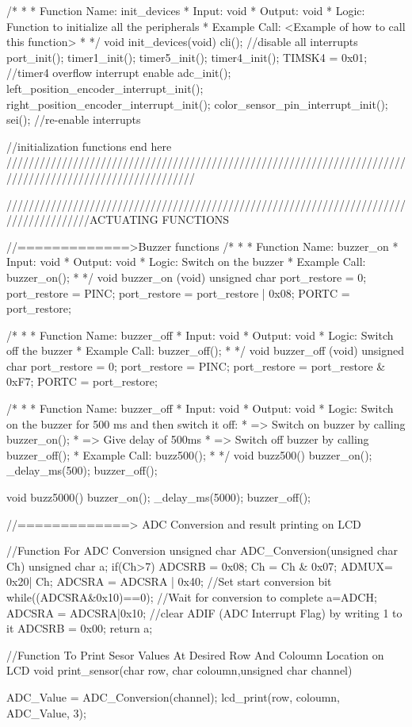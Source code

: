 /*
*
* Function Name: init_devices
* Input: void
* Output: void
* Logic: Function to initialize all the peripherals
* Example Call: <Example of how to call this function>
*
*/
void init_devices(void)
{
	cli(); //disable all interrupts
	port_init();
	timer1_init();
	timer5_init();
	timer4_init();
	TIMSK4 = 0x01; //timer4 overflow interrupt enable
	adc_init();
	left_position_encoder_interrupt_init();
	right_position_encoder_interrupt_init();
	color_sensor_pin_interrupt_init();
	sei(); //re-enable interrupts
}

//initialization functions end here
//////////////////////////////////////////////////////////////////////////////////////////////////////////


///////////////////////////////////////////////////////////////////////////////////////ACTUATING FUNCTIONS

//=============>Buzzer functions
/*
*
* Function Name: buzzer_on
* Input: void
* Output: void
* Logic: Switch on the buzzer
* Example Call: buzzer_on();
*
*/
void buzzer_on (void)
{
	unsigned char port_restore = 0;
	port_restore = PINC;
	port_restore = port_restore | 0x08;
	PORTC = port_restore;
}

/*
*
* Function Name: buzzer_off
* Input: void
* Output: void
* Logic: Switch off the buzzer
* Example Call: buzzer_off();
*
*/
void buzzer_off (void)
{
	unsigned char port_restore = 0;
	port_restore = PINC;
	port_restore = port_restore & 0xF7;
	PORTC = port_restore;
}

/*
*
* Function Name: buzzer_off
* Input: void
* Output: void
* Logic: Switch on the buzzer for 500 ms and then switch it off:
*        => Switch on buzzer by calling buzzer_on();
*        => Give delay of 500ms
*        => Switch off buzzer by calling buzzer_off();
* Example Call: buzz500();
*
*/
void buzz500()
{
	buzzer_on();
	_delay_ms(500);
	buzzer_off();
}

void buzz5000()
{
	buzzer_on();
	_delay_ms(5000);
	buzzer_off();
}


//=============> ADC Conversion and result printing on LCD

//Function For ADC Conversion
unsigned char ADC_Conversion(unsigned char Ch)
{
	unsigned char a;
	if(Ch>7)
	{
		ADCSRB = 0x08;
	}
	Ch = Ch & 0x07;
	ADMUX= 0x20| Ch;
	ADCSRA = ADCSRA | 0x40;		//Set start conversion bit
	while((ADCSRA&0x10)==0);	//Wait for conversion to complete
	a=ADCH;
	ADCSRA = ADCSRA|0x10; //clear ADIF (ADC Interrupt Flag) by writing 1 to it
	ADCSRB = 0x00;
	return a;
}

//Function To Print Sesor Values At Desired Row And Coloumn Location on LCD
void print_sensor(char row, char coloumn,unsigned char channel)
{
	
	ADC_Value = ADC_Conversion(channel);
	lcd_print(row, coloumn, ADC_Value, 3);
}


